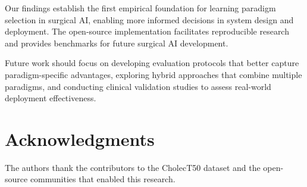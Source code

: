 \documentclass[conference]{IEEEtran}
\begin{document}
Our findings establish the first empirical foundation for learning paradigm selection in surgical AI, enabling more informed decisions in system design and deployment. The open-source implementation facilitates reproducible research and provides benchmarks for future surgical AI development.

Future work should focus on developing evaluation protocols that better capture paradigm-specific advantages, exploring hybrid approaches that combine multiple paradigms, and conducting clinical validation studies to assess real-world deployment effectiveness.

\section*{Acknowledgments}

The authors thank the contributors to the CholecT50 dataset and the open-source communities that enabled this research.
\end{document}
